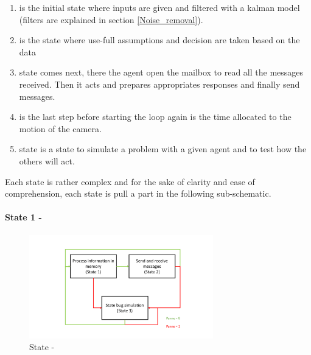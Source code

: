 \begin{enumerate}
    \item {} is the initial state where inputs are given and filtered with a kalman model (filters are explained in section \ref{Noise_removal}). 
    \item {} is the state where use-full assumptions and decision are taken based on the data
    \item {} state comes next, there the agent open the mailbox to read all the messages received. Then it acts and prepares appropriates responses and finally send messages.
    \item {} is the last step before starting the loop again is the time allocated to the motion of the camera. 
    \item {} state is a state to simulate a problem with a given agent and to test how the others will act. 
\end{enumerate}
Each state is rather complex and for the sake of clarity and ease of comprehension, each state is pull a part in  the following sub-schematic.


\paragraph{State 1 - }
\begin{figure}[h!]
    \centering
    \includegraphics[page=3,clip,width = 8cm]{systeme_multi_agent/realisation/multi_agent_implemented_schematic.pdf}
    \caption{State - }
    \label{fig:State1-data_aquisition}
\end{figure}

